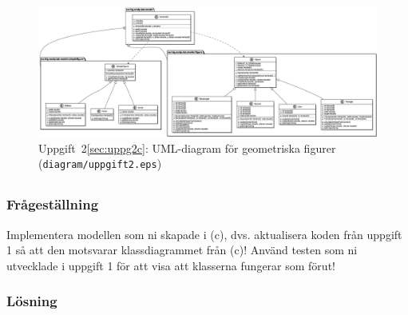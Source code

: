 \begin{figure}
\centering
\includegraphics[width=\linewidth]{diagram/uppgift2.eps}
\caption{Uppgift~2\ref{sec:uppg2c}: UML-diagram för geometriska figurer
(\texttt{diagram/uppgift2.eps})}
\label{fig:uppg2a}
\end{figure}


\subsection{}\label{sec:uppg2d}
\subsubsection*{Frågeställning}
Implementera modellen som ni skapade i (c), dvs. aktualisera koden från
uppgift 1 så att den motsvarar klassdiagrammet från (c)!
Använd testen som ni utvecklade i uppgift 1 för att visa att klasserna fungerar
som förut!

\subsubsection*{Lösning}

